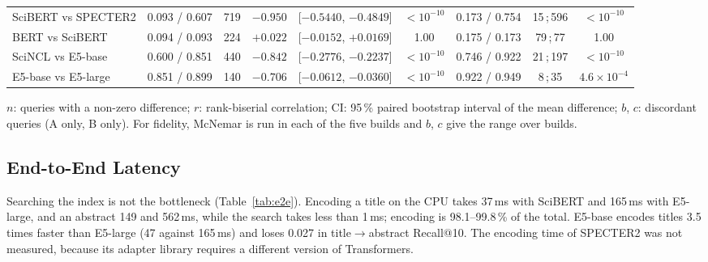 \documentclass[conference, letterpaper]{IEEEtran}
\begin{document}
\begin{table}[!t]
\begin{threeparttable}
\begin{tabular}{@{}l ccc c c cc c@{}}
SciBERT vs SPECTER2  & 0.093 / 0.607 & 719 & $-0.950$ & [$-0.5440$, $-0.4849$] & $<10^{-10}$ & 0.173 / 0.754 & 15\,;\,596 & $<10^{-10}$ \\
BERT vs SciBERT      & 0.094 / 0.093 & 224 & $+0.022$ & [$-0.0152$, $+0.0169$] & 1.00 & 0.175 / 0.173 & 79\,;\,77 & 1.00 \\
SciNCL vs E5-base    & 0.600 / 0.851 & 440 & $-0.842$ & [$-0.2776$, $-0.2237$] & $<10^{-10}$ & 0.746 / 0.922 & 21\,;\,197 & $<10^{-10}$ \\
E5-base vs E5-large  & 0.851 / 0.899 & 140 & $-0.706$ & [$-0.0612$, $-0.0360$] & $<10^{-10}$ & 0.922 / 0.949 & 8\,;\,35 & $4.6\times10^{-4}$ \\
\bottomrule
\end{tabular}
\begin{tablenotes}
\scriptsize
\item $n$: queries with a non-zero difference; $r$: rank-biserial correlation; CI: 95\,\% paired bootstrap interval of the mean difference; $b$, $c$: discordant queries (A only, B only). For fidelity, McNemar is run in each of the five builds and $b$, $c$ give the range over builds.
\end{tablenotes}
\end{threeparttable}
\end{table}

\subsection{End-to-End Latency}

Searching the index is not the bottleneck (Table~\ref{tab:e2e}). Encoding a title on the CPU takes 37\,ms with SciBERT and 165\,ms with E5-large, and an abstract 149 and 562\,ms, while the search takes less than 1\,ms; encoding is 98.1--99.8\,\% of the total. E5-base encodes titles 3.5 times faster than E5-large (47 against 165\,ms) and loses 0.027 in title$\rightarrow$abstract Recall@10. The encoding time of SPECTER2 was not measured, because its adapter library requires a different version of Transformers.
\end{document}
